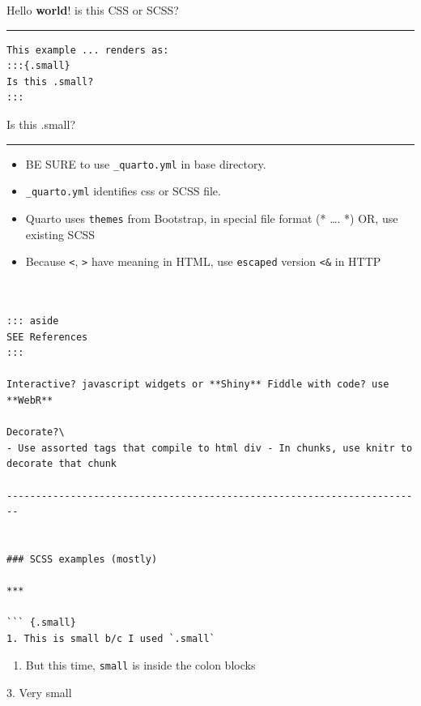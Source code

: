 \documentclass[
]{report}
\newenvironment{Shaded}{\begin{snugshade}}{\end{snugshade}}
\newcommand{\NormalTok}[1]{\textcolor[rgb]{0.00,0.23,0.31}{#1}}
\providecommand{\tightlist}{%
  \setlength{\itemsep}{0pt}\setlength{\parskip}{0pt}}
\begin{document}
\protect{}\label{hello}
Hello \textbf{world}! is this CSS or SCSS?

\begin{center}\rule{0.5\linewidth}{0.5pt}\end{center}

\begin{verbatim}
This example ... renders as:
:::{.small}
Is this .small?
:::
\end{verbatim}

Is this .small?

\begin{center}\rule{0.5\linewidth}{0.5pt}\end{center}

\begin{itemize}
\item
  BE SURE to use \texttt{\_quarto.yml} in base directory.
\item
  \texttt{\_quarto.yml} identifies css or SCSS file.
\item
  Quarto uses \texttt{themes} from Bootstrap, in special file format (*
  \ldots. *) OR, use existing SCSS
\item
  Because \texttt{\textless{}}, \texttt{\textgreater{}} have meaning in
  HTML, use \texttt{escaped} version \texttt{\textless{}\&} in HTTP
\end{itemize}

\begin{verbatim}


::: aside 
SEE References 
:::

Interactive? javascript widgets or **Shiny** Fiddle with code? use
**WebR**

Decorate?\
- Use assorted tags that compile to html div - In chunks, use knitr to
decorate that chunk

------------------------------------------------------------------------


### SCSS examples (mostly)

***

``` {.small}
1. This is small b/c I used `.small` 
\end{verbatim}

\begin{enumerate}
\def\labelenumi{\arabic{enumi}.}
\setcounter{enumi}{1}
\tightlist
\item
  But this time, \texttt{small} is inside the colon blocks
\end{enumerate}

\begin{Shaded}
\begin{Highlighting}[]
\NormalTok{3. Very small}
\end{Highlighting}
\end{Shaded}
\end{document}
